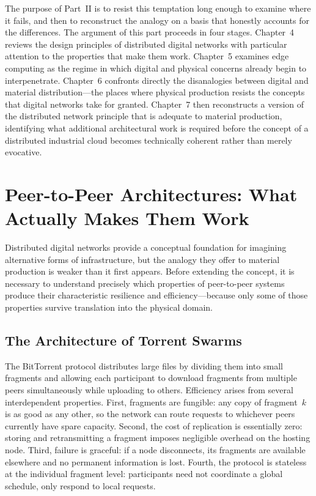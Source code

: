 \documentclass[12pt]{book}
\theoremstyle{definition}
\theoremstyle{remark}
\begin{document}
The purpose of Part~II is to resist this temptation long enough to
examine where it fails, and then to reconstruct the analogy on a
basis that honestly accounts for the differences. The argument of
this part proceeds in four stages. Chapter~4 reviews the design
principles of distributed digital networks with particular attention
to the properties that make them work. Chapter~5 examines edge
computing as the regime in which digital and physical concerns
already begin to interpenetrate. Chapter~6 confronts directly the
disanalogies between digital and material distribution---the places
where physical production resists the concepts that digital networks
take for granted. Chapter~7 then reconstructs a version of the
distributed network principle that is adequate to material
production, identifying what additional architectural work is required
before the concept of a distributed industrial cloud becomes
technically coherent rather than merely evocative.

\chapter{Peer-to-Peer Architectures: What Actually Makes Them Work}

Distributed digital networks provide a conceptual foundation for
imagining alternative forms of infrastructure, but the analogy they
offer to material production is weaker than it first appears. Before
extending the concept, it is necessary to understand precisely which
properties of peer-to-peer systems produce their characteristic
resilience and efficiency---because only some of those properties
survive translation into the physical domain.

\section{The Architecture of Torrent Swarms}

The BitTorrent protocol distributes large files by dividing them into
small fragments and allowing each participant to download fragments
from multiple peers simultaneously while uploading to others.
Efficiency arises from several interdependent properties. First,
fragments are fungible: any copy of fragment~$k$ is as good as any
other, so the network can route requests to whichever peers currently
have spare capacity. Second, the cost of replication is essentially
zero: storing and retransmitting a fragment imposes negligible
overhead on the hosting node. Third, failure is graceful: if a node
disconnects, its fragments are available elsewhere and no permanent
information is lost. Fourth, the protocol is stateless at the
individual fragment level: participants need not coordinate a global
schedule, only respond to local requests.
\end{document}
